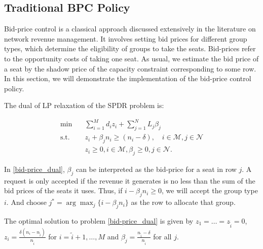 


\subsection{Traditional BPC Policy}
Bid-price control is a classical approach discussed extensively in the literature on network revenue management. It involves setting bid prices for different group types, which determine the eligibility of groups to take the seats. Bid-prices refer to the opportunity costs of taking one seat. As usual, we estimate the bid price of a seat by the shadow price of the capacity constraint corresponding to some row. In this section, we will demonstrate the implementation of the bid-price control policy. 

The dual of LP relaxation of the SPDR problem is:

\begin{equation}\label{bid-price_dual}
    \begin{aligned}
    \min \quad & \sum_{i=1}^{M} d_i z_i + \sum_{j= 1}^{N} L_j \beta_{j} \\
    \text {s.t.} \quad & z_{i} + \beta_j n_i \geq (n_i-\delta), \quad i \in \mathcal{M}, j \in \mathcal{N} \\
    & z_{i} \geq 0, i \in \mathcal{M}, \beta_{j} \geq 0, j \in \mathcal{N}.
    \end{aligned}
  \end{equation}

In \eqref{bid-price_dual}, $\beta_{j}$ can be interpreted as the bid-price for a seat in row $j$. A request is only accepted if the revenue it generates is no less than the sum of the bid prices of the seats it uses. Thus, if $i -\beta_{j} n_i \geq 0$, we will accept the group type $i$. And choose $j^{*} = \arg \max_{j} \{i -\beta_{j} n_i\}$ as the row to allocate that group.
  
\begin{lem}\label{bid-price}
The optimal solution to problem \eqref{bid-price_dual} is given by $z_1 = \ldots = z_{\tilde{i}} =0$, $z_{i} = \frac{\delta(n_i-n_{\tilde{i}})}{n_{\tilde{i}}}$ for $i = \tilde{i}+1, \ldots, M$ and $\beta_j = \frac{n_{\tilde{i}} - \delta}{n_{\tilde{i}}}$ for all $j$.
\end{lem}

